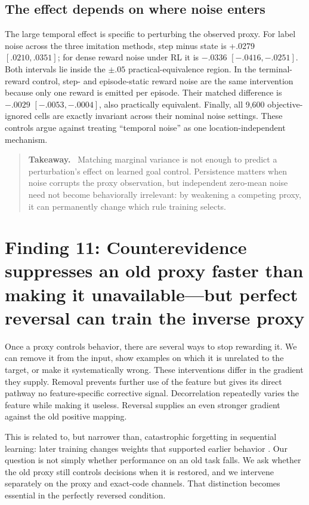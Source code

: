 \documentclass[11pt,a4paper]{article}
\newenvironment{takeaway}{%
  \begin{quote}\small\color{ink}\noindent\textbf{Takeaway.}\ 
}{%
  \end{quote}
}
\begin{document}
\subsection*{The effect depends on where noise enters}

The large temporal effect is specific to perturbing the observed proxy. For label noise across the three imitation methods, step minus state is +.0279 $[.0210,.0351]$; for dense reward noise under RL it is $-.0336$ $[-.0416,-.0251]$. Both intervals lie inside the $\pm.05$ practical-equivalence region. In the terminal-reward control, step- and episode-static reward noise are the same intervention because only one reward is emitted per episode. Their matched difference is $-.0029$ $[-.0053,-.0004]$, also practically equivalent. Finally, all 9,600 objective-ignored cells are exactly invariant across their nominal noise settings. These controls argue against treating ``temporal noise'' as one location-independent mechanism.

\begin{takeaway}
Matching marginal variance is not enough to predict a perturbation's effect on learned goal control. Persistence matters when noise corrupts the proxy observation, but independent zero-mean noise need not become behaviorally irrelevant: by weakening a competing proxy, it can permanently change which rule training selects.
\end{takeaway}

\section*{Finding 11: Counterevidence suppresses an old proxy faster than making it unavailable---but perfect reversal can train the inverse proxy}

Once a proxy controls behavior, there are several ways to stop rewarding it. We can remove it from the input, show examples on which it is unrelated to the target, or make it systematically wrong. These interventions differ in the gradient they supply. Removal prevents further use of the feature but gives its direct pathway no feature-specific corrective signal. Decorrelation repeatedly varies the feature while making it useless. Reversal supplies an even stronger gradient against the old positive mapping.

This is related to, but narrower than, catastrophic forgetting in sequential learning: later training changes weights that supported earlier behavior \citep{kirkpatrick2017forgetting}. Our question is not simply whether performance on an old task falls. We ask whether the old proxy still controls decisions when it is restored, and we intervene separately on the proxy and exact-code channels. That distinction becomes essential in the perfectly reversed condition.
\end{document}
